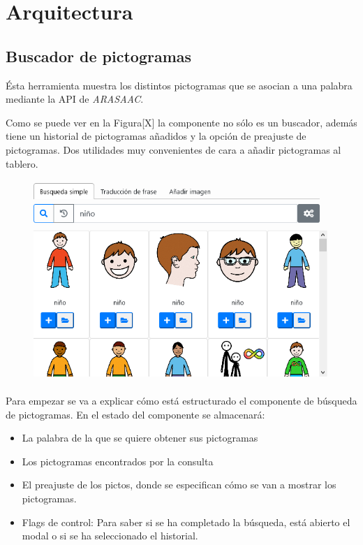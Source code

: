 \chapter{Arquitectura}
\label{cap:arquitectura}



\begin{resumen} 
	
	
\end{resumen}


\section{Buscador de pictogramas}

Ésta herramienta muestra los distintos pictogramas que se asocian a una palabra mediante la API de \textit{ARASAAC}. 

Como se puede ver en la Figura[X] la componente no sólo es un buscador, además tiene un historial de pictogramas añadidos y la opción de preajuste de pictogramas. Dos utilidades muy convenientes de cara a añadir pictogramas al tablero. 

\begin{figure}[h!]
	\centering
	\includegraphics[width=0.7\linewidth]{Imagenes/Bitmap/buscarPicto2}
	\caption{}
	\label{fig:buscarpicto2}
\end{figure}


Para empezar se va a explicar cómo está estructurado el componente de búsqueda de pictogramas. En el estado del componente se almacenará: 

\begin{itemize}
	\item La palabra de la que se quiere obtener sus pictogramas
	\item Los pictogramas encontrados por la consulta
	\item El preajuste de los pictos, donde se especifican cómo se van a mostrar los pictogramas.
	\item Flags de control: Para saber si se ha completado la búsqueda, está abierto el modal o si se ha seleccionado el historial. 	
\end{itemize}



